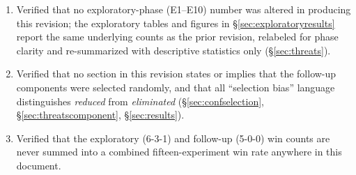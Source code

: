 \documentclass[10pt,conference]{IEEEtran}
\begin{document}
\begin{enumerate}
\item Verified that no exploratory-phase (E1--E10) number was altered in producing this revision; the exploratory tables and figures in \S\ref{sec:exploratoryresults} report the same underlying counts as the prior revision, relabeled for phase clarity and re-summarized with descriptive statistics only (\S\ref{sec:threats}).
\item Verified that no section in this revision states or implies that the follow-up components were selected randomly, and that all ``selection bias'' language distinguishes \emph{reduced} from \emph{eliminated} (\S\ref{sec:confselection}, \S\ref{sec:threatscomponent}, \S\ref{sec:results}).
\item Verified that the exploratory (6-3-1) and follow-up (5-0-0) win counts are never summed into a combined fifteen-experiment win rate anywhere in this document.
\end{enumerate}
\end{document}
